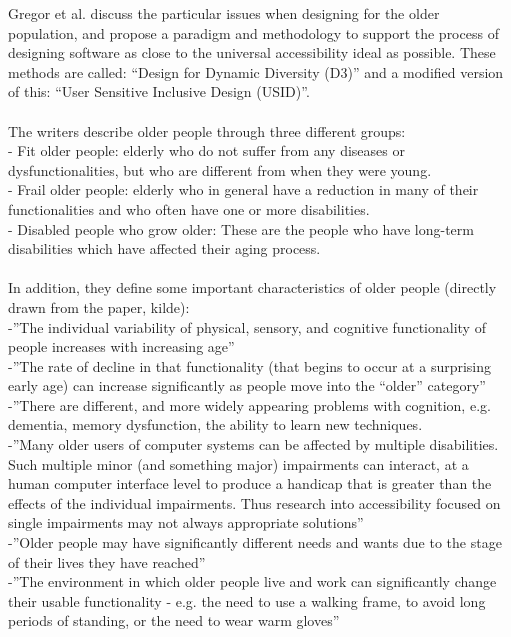 Gregor et al. discuss the particular issues when designing for the older population, and propose a paradigm and methodology to support the process of designing software as close to the universal accessibility ideal as possible. These methods are called: “Design for Dynamic Diversity (D3)” and a modified version of this: “User Sensitive Inclusive Design (USID)”.\\ \\
The writers describe older people through three different groups: \\
- Fit older people: elderly who do not suffer from any diseases or dysfunctionalities, but who are different from when they were young.\\
- Frail older people: elderly who in  general have a reduction in many of their functionalities and who often have one or more disabilities.\\
- Disabled people who grow older: These are the people who have long-term disabilities which have affected their aging process. \\ \\
In addition, they define some important characteristics of older people (directly drawn from the paper, kilde):\\
-”The individual variability of physical, sensory, and cognitive functionality of people increases with increasing age”\\
-”The rate of decline in that functionality (that begins to occur at a surprising early age) can increase significantly as people move into the “older” category”\\
-”There are different, and more widely appearing problems with cognition, e.g. dementia, memory dysfunction, the ability to learn new techniques.\\
-”Many older users of computer systems can be affected by multiple disabilities. Such multiple minor (and something major) impairments can interact, at a human computer interface level to produce a handicap that is greater than the effects of the individual impairments. Thus research into accessibility focused on single impairments may not always appropriate solutions”\\
-”Older people may have significantly different needs and wants due to the stage of their lives they have reached”\\
-”The environment in which older people live and work can significantly change their usable functionality - e.g. the need to use a walking frame, to avoid long periods of standing, or the need to wear warm gloves”\\
